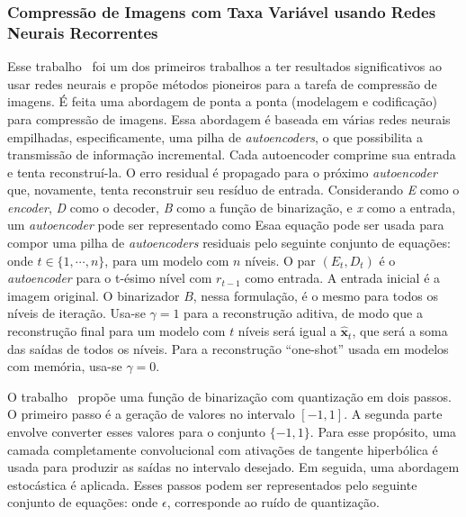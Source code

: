\subsubsection{Compressão de Imagens com Taxa Variável usando Redes Neurais Recorrentes}
\label{variablerate}
Esse trabalho~\cite{toderici2016} foi um dos primeiros trabalhos a ter resultados significativos ao usar redes neurais e propõe métodos pioneiros para a tarefa de compressão de imagens. É feita uma abordagem de ponta a ponta (modelagem e codificação) para compressão de imagens. Essa abordagem é baseada em várias redes neurais empilhadas, especificamente, uma pilha de \textit{autoencoders}, o que possibilita a transmissão de informação incremental. Cada autoencoder comprime sua entrada e tenta reconstruí-la. O erro residual é propagado para o próximo \textit{autoencoder} que, novamente, tenta reconstruir seu resíduo de entrada. Considerando \textit{E} como o \textit{encoder}, \textit{D} como o decoder, \textit{B} como a função de binarização, e \textit{x} como a entrada, um \textit{autoencoder} pode ser representado como 
Esaa equação pode ser usada para compor uma pilha de \textit{autoencoders} residuais pelo seguinte conjunto de equações:
onde $t \in \{1,\cdots,n\}$, para um modelo com $n$ níveis. O par $(E_t, D_t)$ é o \textit{autoencoder} para o t-ésimo nível com $r_{t-1}$ como entrada. A entrada inicial é a imagem original. O binarizador $B$, nessa formulação, é o mesmo para todos os níveis de iteração. Usa-se $\gamma = 1$ para a reconstrução aditiva, de modo que a reconstrução final para um modelo com $t$ níveis será igual a $\hat{\mathbf{x}}_t$, que será a soma das saídas de todos os níveis. Para a reconstrução ``one-shot'' usada em modelos com memória, usa-se $\gamma = 0$.

O trabalho~\cite{toderici2016} propõe uma função de binarização com quantização em dois passos. O primeiro passo é a geração de valores no intervalo $[-1, 1]$. A segunda parte envolve converter esses valores para o conjunto $\{-1, 1\}$. Para esse propósito, uma camada completamente convolucional com ativações de tangente hiperbólica é usada para produzir as saídas no intervalo desejado. Em seguida, uma abordagem estocástica é aplicada. Esses passos podem ser representados pelo seguinte conjunto de equações:   onde $\epsilon$, corresponde ao ruído de quantização.
    
